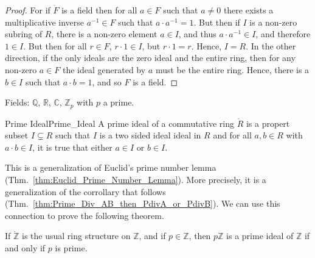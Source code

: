 \documentclass{article}                                                        %
\begin{document}
        \begin{proof}
            For if $\ring{F}$ is a field then for all $a\in{F}$ such that
            $a\ne{0}$ there exists a multiplicative inverse
            $a^{\minus{1}}\in{F}$ such that $a\cdot{a}^{\minus{1}}=1$. But then
            if $I$ is a non-zero subring of $R$, there is a non-zero element
            $a\in{I}$, and thus $a\cdot{a}^{\minus{1}}\in{I}$, and
            therefore $1\in{I}$. But then for all $r\in{F}$, $r\cdot{1}\in{I}$,
            but $r\cdot{1}=r$. Hence, $I=R$. In the other direction, if
            the only ideals are the zero ideal and the entire ring, then for
            any non-zero $a\in{F}$ the ideal generated by $a$ must be the entire
            ring. Hence, there is a $b\in{I}$ such that $a\cdot{b}=1$, and so
            $F$ is a field.
        \end{proof}
        \begin{example}
            Fields: $\mathbb{Q}$, $\mathbb{R}$, $\mathbb{C}$, $\mathbb{Z}_{p}$
            with $p$ a prime.
        \end{example}
        \begin{fdefinition}{Prime Ideal}{Prime_Ideal}
            A prime ideal of a commutative ring $\ring{R}$ is a propert subset
            $I\subsetneq{R}$ such that $I$ is a two sided ideal ideal in $R$
            and for all $a,b\in{R}$ with $a\cdot{b}\in{I}$, it is true that
            either $a\in{I}$ or $b\in{I}$.
        \end{fdefinition}
        This is a generalization of Euclid's prime number lemma
        (Thm.~\ref{thm:Euclid_Prime_Number_Lemma}). More precisely, it is a
        generalization of the corrollary that follows
        (Thm.~\ref{thm:Prime_Div_AB_then_PdivA_or_PdivB}). We can use this
        connection to prove the following theorem.
        \begin{theorem}
            \label{thm:Prime_Ideals_of_Z}%
            If $\ring{\mathbb{Z}}$ is the usual ring structure on $\mathbb{Z}$,
            and if $p\in\mathbb{Z}$, then $p\mathbb{Z}$ is a prime ideal of
            $\mathbb{Z}$ if and only if $p$ is prime.
        \end{theorem}
\end{document}
